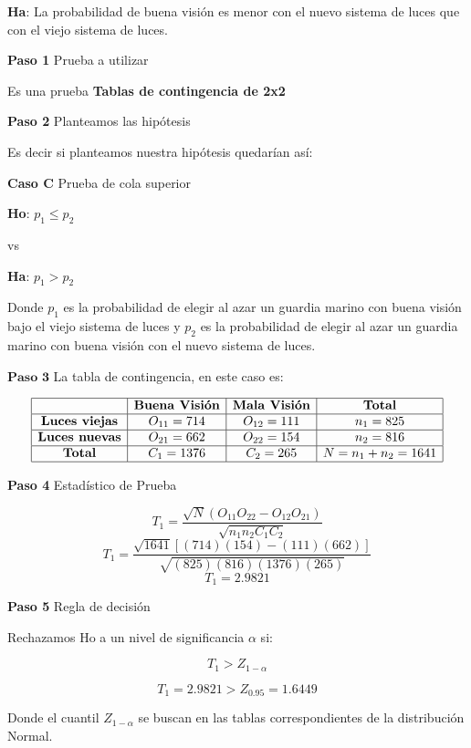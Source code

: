 \documentclass[a4paper,oneside,openany]{book}
\begin{document}
\textbf{Ha}: La probabilidad de buena visión es menor con el nuevo
sistema de luces que con el viejo sistema de luces.

\textbf{Paso 1} Prueba a utilizar

Es una prueba \textbf{Tablas de contingencia de 2x2}

\textbf{Paso 2} Planteamos las hipótesis

Es decir si planteamos nuestra hipótesis quedarían así:

\textbf{Caso C} Prueba de cola superior

\textbf{Ho}: \(p_{1} \leq p_{2}\)

vs

\textbf{Ha}: \(p_{1} > p_{2}\)

Donde \(p_{1}\) es la probabilidad de elegir al azar un guardia marino
con buena visión bajo el viejo sistema de luces y \(p_{2}\) es la
probabilidad de elegir al azar un guardia marino con buena visión con el
nuevo sistema de luces.

\(\textbf{Paso 3}\) La tabla de contingencia, en este caso es:

\[
\begin{equation*}
\begin{array}{|c|c|c|c|}
\hline
 & \textbf{Buena Visión} & \textbf{Mala Visión} & \textbf{Total}   \\
\hline
\textbf{Luces viejas} & O_{11}= 714 & O_{12}=111 & n_{1}=825   \\
\hline
\textbf{Luces nuevas} & O_{21}=662 & O_{22}=154 & n_{2}=816\\
\hline
\textbf{Total}  & C_{1}=1376 & C_{2}=265   & N=n_{1}+n_{2}=1641 \\
\hline
\end{array}
\end{equation*}
\]

\textbf{Paso 4} Estadístico de Prueba

\[T_{1}=\frac{\sqrt{N}(O_{11}O_{22}-O_{12}O_{21})}{\sqrt{n_{1}n_{2}C_{1}C_{2}}}\]
\[T_{1}=\frac{\sqrt{1641}[(714)(154)-(111)(662)]}{\sqrt{(825)(816)(1376)(265)}}\]
\[T_{1}= 2.9821\]

\textbf{Paso 5} Regla de decisión

Rechazamos Ho a un nivel de significancia \(\alpha\) si:

\[T_{1} > Z_{1-\alpha}\]

\[T_{1}=2.9821 > Z_{0.95}= 1.6449\]

Donde el cuantil \(Z_{1-\alpha}\) se buscan en las tablas
correspondientes de la distribución Normal.
\end{document}
